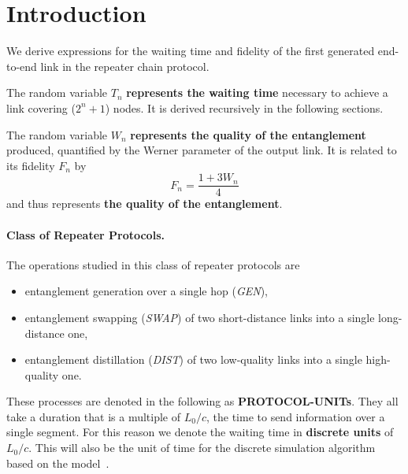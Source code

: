 \documentclass{masterthesis}
\begin{document}
\section{Introduction}

We derive expressions for the waiting time and fidelity of the first generated end-to-end link in the repeater chain protocol.

The random variable $T_{n}$ \textbf{represents the waiting time} necessary to achieve a link covering ($2^{n}+1$) nodes. 
It is derived recursively in the following sections.

The random variable $W_{n}$ \textbf{represents the quality of the entanglement} produced, quantified by the Werner parameter of the output link. It is related to its fidelity $F_{n}$ by
\begin{equation}
    F_{n} = \frac{1 + 3 W_{n}}{4}
\end{equation}
and thus represents \textbf{the quality of the entanglement}.


\paragraph*{Class of Repeater Protocols.}

The operations studied in this class of repeater protocols are
\begin{itemize}
    \item entanglement generation over a single hop (\textit{GEN}),
    \item entanglement swapping (\textit{SWAP}) of two short-distance links into a single long-distance one,
    \item entanglement distillation (\textit{DIST}) of two low-quality links into a single high-quality one.
\end{itemize}
These processes are denoted in the following as \textbf{PROTOCOL-UNITs}. They all take a duration that is a multiple of ${L_0}/{c}$, the time to send information over a single segment. For this reason we denote the waiting time in \textbf{discrete units} of ${L_0}/{c}$. 
This will also be the unit of time for the discrete simulation algorithm based on the model~\cite{Li_2021}.
\end{document}
